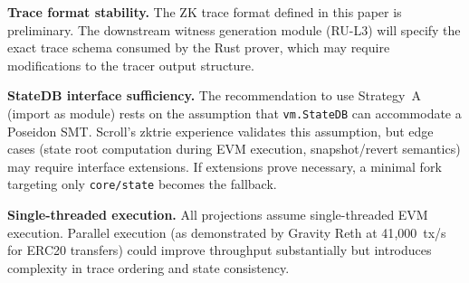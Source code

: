 \textbf{Trace format stability.} The ZK trace format defined in this paper
is preliminary. The downstream witness generation module (RU-L3) will
specify the exact trace schema consumed by the Rust prover, which may
require modifications to the tracer output structure.

\textbf{StateDB interface sufficiency.} The recommendation to use Strategy~A
(import as module) rests on the assumption that \texttt{vm.StateDB} can
accommodate a Poseidon SMT. Scroll's zktrie experience validates this
assumption, but edge cases (state root computation during EVM execution,
snapshot/revert semantics) may require interface extensions. If extensions
prove necessary, a minimal fork targeting only \texttt{core/state} becomes
the fallback.

\textbf{Single-threaded execution.} All projections assume single-threaded
EVM execution. Parallel execution (as demonstrated by Gravity Reth at
41{,}000~tx/s for ERC20 transfers) could improve throughput substantially
but introduces complexity in trace ordering and state consistency.
